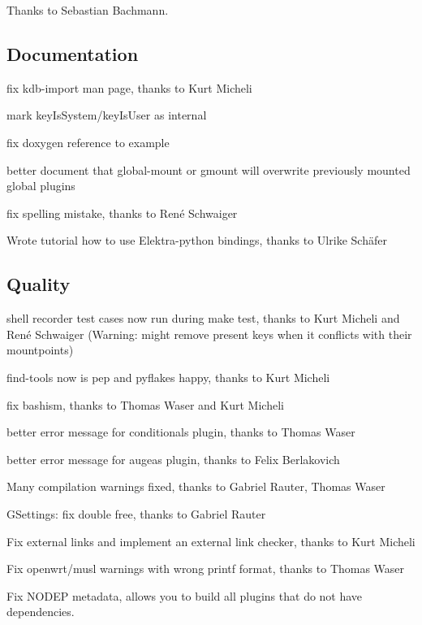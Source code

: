 Thanks to Sebastian Bachmann.

\subsection*{Documentation}


\begin{DoxyItemize}
\item fix {\ttfamily kdb-\/import} man page, thanks to Kurt Micheli
\item mark {\ttfamily key\+Is\+System}/{\ttfamily key\+Is\+User} as internal
\item fix doxygen reference to example
\item better document that {\ttfamily global-\/mount} or {\ttfamily gmount} will overwrite previously mounted global plugins
\item fix spelling mistake, thanks to René Schwaiger
\item Wrote tutorial how to use Elektra-\/python bindings, thanks to Ulrike Schäfer
\end{DoxyItemize}

\subsection*{Quality}


\begin{DoxyItemize}
\item shell recorder test cases now run during {\ttfamily make test}, thanks to Kurt Micheli and René Schwaiger (Warning\+: might remove present keys when it conflicts with their mountpoints)
\item find-\/tools now is pep and pyflakes happy, thanks to Kurt Micheli
\item fix bashism, thanks to Thomas Waser and Kurt Micheli
\item better error message for conditionals plugin, thanks to Thomas Waser
\item better error message for augeas plugin, thanks to Felix Berlakovich
\item Many compilation warnings fixed, thanks to Gabriel Rauter, Thomas Waser
\item G\+Settings\+: fix double free, thanks to Gabriel Rauter
\item Fix external links and implement an external link checker, thanks to Kurt Micheli
\item Fix openwrt/musl warnings with wrong printf format, thanks to Thomas Waser
\item Fix N\+O\+D\+EP metadata, allows you to build all plugins that do not have dependencies.
\end{DoxyItemize}

